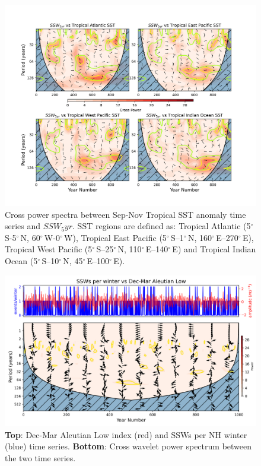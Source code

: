 \documentclass[wcd, manuscript]{copernicus}
\begin{document}
\begin{center}
\begin{figure}[h!]
\noindent\includegraphics[width = \linewidth]{new_changed_figures/SSW_5yr_vs_trop_SSTs_crosspower_new_levels.png}
\caption{Cross power spectra between Sep-Nov Tropical SST anomaly time series and $SSW_5yr$. SST regions are defined as: Tropical Atlantic (5$^{\circ}$\,S-5$^{\circ}$\,N, 60$^{\circ}$\,W-0$^{\circ}$\,W), Tropical East Pacific (5$^{\circ}$\,S–1${^\circ}$\,N, 160$^{\circ}$\,E–270$^{\circ}$\,E), Tropical West Pacific (5$^{\circ}$\,S–25$^{\circ}$\,N, 110$^{\circ}$\,E–140$^{\circ}$\,E) and Tropical Indian Ocean (5$^{\circ}$\,S–10$^{\circ}$\,N, 45$^{\circ}$\,E–100$^{\circ}$\,E).}
\label{fig3}
\end{figure}
\end{center}


\begin{center}
\begin{figure}[h!]
\includegraphics[width = \linewidth]{new_changed_figures/cross_power_SSWs_vs_AL_new_levels.png}
\caption{\textbf{Top}: Dec-Mar Aleutian Low index (red) and SSWs per NH winter (blue) time series. \textbf{Bottom}: Cross wavelet power spectrum between the two time series.}
\end{figure}
\end{center}
\end{document}
